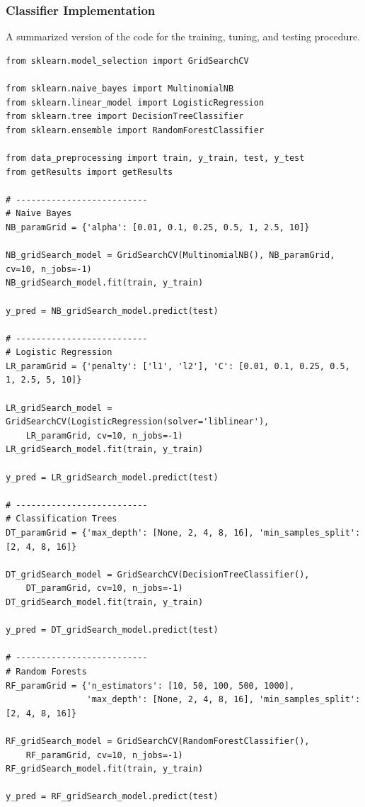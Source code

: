\documentclass[a4paper, 11pt]{article}
\begin{document}
\subsubsection{Classifier Implementation}
A summarized version of the code for the training, tuning, and testing procedure.
\begin{lstlisting}
from sklearn.model_selection import GridSearchCV

from sklearn.naive_bayes import MultinomialNB
from sklearn.linear_model import LogisticRegression
from sklearn.tree import DecisionTreeClassifier
from sklearn.ensemble import RandomForestClassifier

from data_preprocessing import train, y_train, test, y_test
from getResults import getResults

# --------------------------
# Naive Bayes
NB_paramGrid = {'alpha': [0.01, 0.1, 0.25, 0.5, 1, 2.5, 10]}

NB_gridSearch_model = GridSearchCV(MultinomialNB(), NB_paramGrid, cv=10, n_jobs=-1)
NB_gridSearch_model.fit(train, y_train)

y_pred = NB_gridSearch_model.predict(test)

# --------------------------
# Logistic Regression
LR_paramGrid = {'penalty': ['l1', 'l2'], 'C': [0.01, 0.1, 0.25, 0.5, 1, 2.5, 5, 10]}

LR_gridSearch_model = GridSearchCV(LogisticRegression(solver='liblinear'), 
    LR_paramGrid, cv=10, n_jobs=-1)
LR_gridSearch_model.fit(train, y_train)

y_pred = LR_gridSearch_model.predict(test)

# --------------------------
# Classification Trees
DT_paramGrid = {'max_depth': [None, 2, 4, 8, 16], 'min_samples_split': [2, 4, 8, 16]}

DT_gridSearch_model = GridSearchCV(DecisionTreeClassifier(), 
    DT_paramGrid, cv=10, n_jobs=-1)
DT_gridSearch_model.fit(train, y_train)

y_pred = DT_gridSearch_model.predict(test)

# --------------------------
# Random Forests
RF_paramGrid = {'n_estimators': [10, 50, 100, 500, 1000],
                'max_depth': [None, 2, 4, 8, 16], 'min_samples_split': [2, 4, 8, 16]}

RF_gridSearch_model = GridSearchCV(RandomForestClassifier(), 
    RF_paramGrid, cv=10, n_jobs=-1)
RF_gridSearch_model.fit(train, y_train)

y_pred = RF_gridSearch_model.predict(test)
\end{lstlisting}
\clearpage
\end{document}
